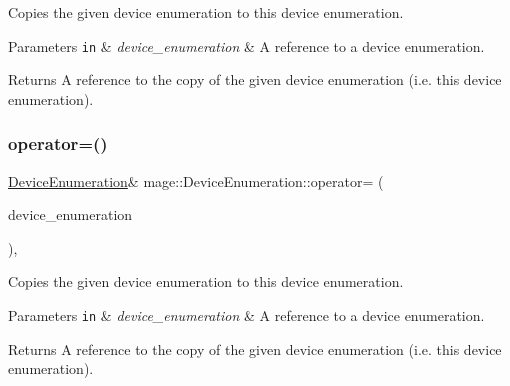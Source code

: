 Copies the given device enumeration to this device enumeration.


\begin{DoxyParams}[1]{Parameters}
\mbox{\tt in}  & {\em device\+\_\+enumeration} & A reference to a device enumeration. \\
\hline
\end{DoxyParams}
\begin{DoxyReturn}{Returns}
A reference to the copy of the given device enumeration (i.\+e. this device enumeration). 
\end{DoxyReturn}
\hypertarget{classmage_1_1_device_enumeration_accf36804bfe510cc8a4d8495854596d6}{}\label{classmage_1_1_device_enumeration_accf36804bfe510cc8a4d8495854596d6} 
\subsubsection{\texorpdfstring{operator=()}{operator=()}\hspace{0.1cm}{\footnotesize\ttfamily [2/2]}}
{\footnotesize\ttfamily \hyperlink{classmage_1_1_device_enumeration}{Device\+Enumeration}\& mage\+::\+Device\+Enumeration\+::operator= (\begin{DoxyParamCaption}\item[{\hyperlink{classmage_1_1_device_enumeration}{Device\+Enumeration} \&\&}]{device\+\_\+enumeration }\end{DoxyParamCaption})\hspace{0.3cm}{\ttfamily [private]}, {\ttfamily [delete]}}

Copies the given device enumeration to this device enumeration.


\begin{DoxyParams}[1]{Parameters}
\mbox{\tt in}  & {\em device\+\_\+enumeration} & A reference to a device enumeration. \\
\hline
\end{DoxyParams}
\begin{DoxyReturn}{Returns}
A reference to the copy of the given device enumeration (i.\+e. this device enumeration). 
\end{DoxyReturn}
\hypertarget{classmage_1_1_device_enumeration_a5950a6575d9073d6d23b228779f5ace1}{}\label{classmage_1_1_device_enumeration_a5950a6575d9073d6d23b228779f5ace1} 
